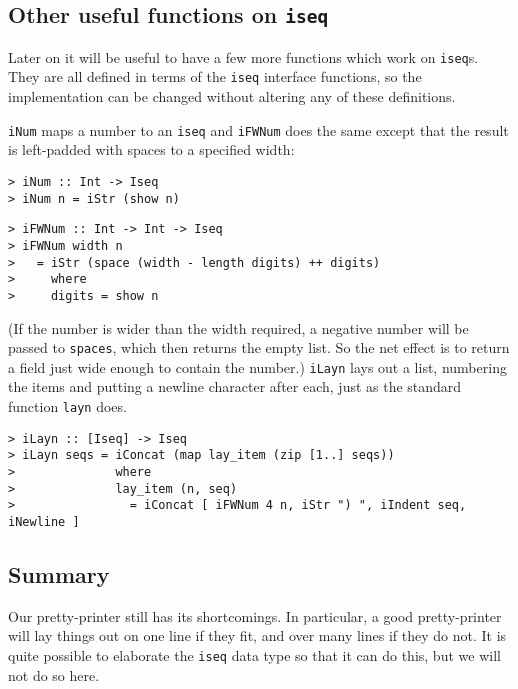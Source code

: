 \subsection{Other useful functions on \mbox{\tt iseq}}

Later on it will be useful to have a few more functions which work on
\mbox{\tt iseq}s.  They are all defined in terms of the \mbox{\tt iseq} interface functions,
so the implementation can be changed without altering any of these definitions.

\mbox{\tt iNum} maps a number to an \mbox{\tt iseq} and \mbox{\tt iFWNum} does the same except that
the result is left-padded with spaces to a specified width:
\begin{verbatim}
> iNum :: Int -> Iseq
> iNum n = iStr (show n)
\end{verbatim}
%
%
\begin{verbatim}
> iFWNum :: Int -> Int -> Iseq
> iFWNum width n
>   = iStr (space (width - length digits) ++ digits)
>     where
>     digits = show n
\end{verbatim}
%
%
(If the number is wider than the width required, a negative number will
be passed to \mbox{\tt spaces}, which then returns the empty list.  So the net
effect is to return a field just wide enough to contain the number.)
\mbox{\tt iLayn} lays out a list, numbering the items and putting a  newline
character after each, just as the standard function \mbox{\tt layn} does.
\begin{verbatim}
> iLayn :: [Iseq] -> Iseq
> iLayn seqs = iConcat (map lay_item (zip [1..] seqs))
>              where
>              lay_item (n, seq)
>                = iConcat [ iFWNum 4 n, iStr ") ", iIndent seq, iNewline ]
\end{verbatim}
%
%
\subsection{Summary}

Our pretty-printer still has its shortcomings.  In particular, a good
pretty-printer will lay things out on one line if they fit, and over
many  lines if they do not.  It is quite possible to elaborate the
\mbox{\tt iseq} data type so that it can do this, but we will not do so here.

